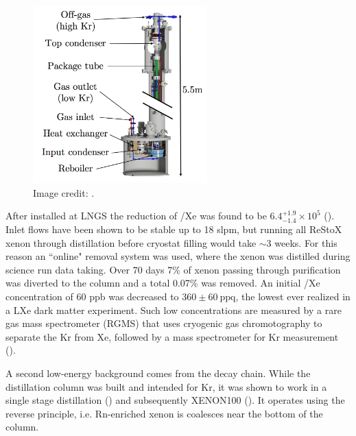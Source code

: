 \begin{figure}
\centering
\includegraphics[width=0.6\textwidth]{KrColumn}
\caption{Image credit: .}
\label{fig:xeno1t_kr_dist_column}
\end{figure}

After installed at LNGS the reduction of /Xe was found to be $6.4_{-1.4}^{+1.9} \times 10^{5}$
().  Inlet flows have been shown to be stable up to 18 slpm, but running all ReStoX xenon through distillation before
cryostat filling would take ${\sim}3$ weeks.  For this reason an ``online" removal system was used, where the xenon was distilled during
science run data taking.  Over 70 days 7\% of xenon passing through purification was diverted to the column and a total 0.07\% was
removed.  An initial /Xe concentration of 60 ppb was decreased to $360 \pm 60\ \mathrm{ppq}$, the lowest ever realized in a
LXe dark matter experiment.  Such low concentrations are measured by a rare gas mass spectrometer (RGMS) that uses cryogenic gas
chromotography to separate the Kr from Xe, followed by a mass spectrometer for Kr measurement ().

A second low-energy background comes from the  decay chain.  While the distillation column was built and intended for Kr,
it was shown to work in a single stage distillation () and subsequently XENON100
().  It operates using the reverse principle, i.e. Rn-enriched xenon is coalesces near the bottom of the column.



